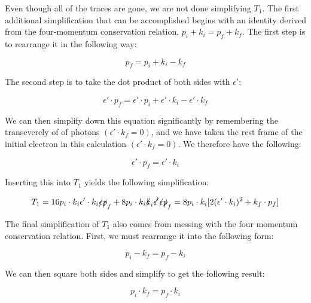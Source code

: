 \documentclass[a4]{article}
\begin{document}
    Even though all of the traces are gone, we are not done simplifying $T_1$. The first additional simplification that can be accomplished begins with an identity derived from the
    four-momentum conservation relation, $p_i + k_i = p_f + k_f$. The first step is to rearrange it in the following way:

    \begin{equation}
        p_f = p_i + k_i - k_f
    \end{equation}

    The second step is to take the dot product of both sides with $\epsilon'$:

    \begin{equation}
        \epsilon' \cdot p_f = \epsilon' \cdot p_i + \epsilon' \cdot k_i - \epsilon' \cdot k_f
    \end{equation}

    We can then simplify down this equation significantly by remembering the transeverely of of photons $(\epsilon' \cdot k_f = 0)$, and we have taken the rest frame of the initial
    electron in this calculation $(\epsilon' \cdot k_f = 0)$. We therefore have the following:

    \begin{equation}
        \epsilon' \cdot p_f = \epsilon' \cdot k_i
    \end{equation}

    Inserting this into $T_1$ yields the following simplification:

    \begin{equation}
        T_1 = 16 p_i \cdot k_i \epsilon' \cdot k_i \slashed{\epsilon} \slashed{p}_f + 8 p_i \cdot k_i \slashed{k}_i \slashed{\epsilon'} \slashed{\epsilon} \slashed{p}_f = 8 p_i \cdot k_i [2 (\epsilon' \cdot k_i)^2 + k_f \cdot p_f]
    \end{equation}

    The final simplification of $T_1$ also comes from messing with the four momentum conservation relation. First, we must rearrange it into the following form:

    \begin{equation}
        p_i - k_f = p_f - k_i
    \end{equation}

    We can then square both sides and simplify to get the following result:

    \begin{equation}
        p_i \cdot k_f = p_f \cdot k_i
    \end{equation}
\end{document}
